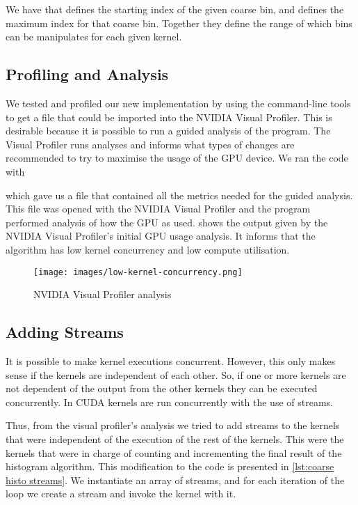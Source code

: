 We have that  defines the starting index of the given coarse bin, and  defines the maximum index for that coarse bin.
Together they define the range of which bins can be manipulates for each given kernel.

\subsection{Profiling and Analysis}

We tested and profiled our new implementation by using the  command-line tools to get a file that could be imported into the NVIDIA Visual Profiler.
This is desirable because it is possible to run a guided analysis of the program.
The Visual Profiler runs analyses and informs what types of changes are recommended to try to maximise the usage of the GPU device.
We ran the code with

\begin{quote}
\end{quote}

which gave us a file that contained all the metrics needed for the guided analysis.
This file was opened with the NVIDIA Visual Profiler and the program performed analysis of how the GPU as used.
 shows the output given by the NVIDIA Visual Profiler's initial GPU usage analysis.
It informs that the algorithm has low kernel concurrency and low compute utilisation.

\begin{figure}[htb]
  \centering
  \texttt{[image: images/low-kernel-concurrency.png]}
  \caption{NVIDIA Visual Profiler analysis}
  \label{fig:first impl}
\end{figure}

\subsection{Adding Streams}

It is possible to make kernel executions concurrent.
However, this only makes sense if the kernels are independent of each other.
So, if one or more kernels are not dependent of the output from the other kernels they can be executed concurrently.
In CUDA kernels are run concurrently with the use of streams.

Thus, from the visual profiler's analysis we tried to add streams to the kernels that were independent of the execution of the rest of the kernels.
This were the kernels that were in charge of counting and incrementing the final result of the histogram algorithm.
This modification to the code is presented in \cref{lst:coarse histo streams}.
We instantiate an array of streams, and for each iteration of the loop we create a stream and invoke the kernel with it.

